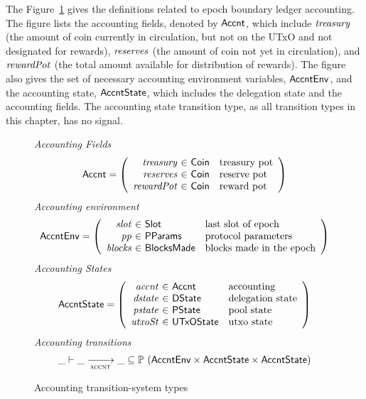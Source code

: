 The Figure~\ref{fig:ts-types:accnt} gives the definitions related to epoch
boundary ledger accounting. The figure lists the accounting fields, denoted by
$\mathsf{Accnt}$, which include $\mathit{treasury}$ (the amount of coin currently in
circulation, but not on the UTxO and not designated for rewards),
$\mathit{reserves}$ (the amount of coin
not yet in circulation),
and $\mathit{rewardPot}$ (the total amount available for distribution of rewards).
The figure also gives the set of necessary accounting environment
variables, $\mathsf{AccntEnv}$, and the accounting state, $\mathsf{AccntState}$, which includes
the delegation state and the accounting fields. The accounting state transition
type, as all transition types in this chapter, has no signal.

\begin{figure}[htb]
  \emph{Accounting Fields}
  \begin{equation*}
    \Accnt =
    \left(
      \begin{array}{r@{~\in~}ll}
        \var{treasury} & \Coin & \text{treasury pot}\\
        \var{reserves} & \Coin & \text{reserve pot}\\
        \var{rewardPot} & \Coin & \text{reward pot}\\
      \end{array}
    \right)
  \end{equation*}
  \emph{Accounting environment}
  \begin{equation*}
    \AccntEnv =
    \left(
      \begin{array}{r@{~\in~}ll}
        \var{slot} & \Slot & \text{last slot of epoch}\\
        \var{pp} & \PParams & \text{protocol parameters}\\
        \var{blocks} & \BlocksMade & \text{blocks made in the epoch}\\
      \end{array}
    \right)
  \end{equation*}
  \emph{Accounting States}
  \begin{equation*}
    \AccntState =
    \left(
      \begin{array}{r@{~\in~}ll}
        \var{accnt} & \Accnt & \text{accounting}\\
        \var{dstate} & \DState & \text{delegation state}\\
        \var{pstate} & \PState & \text{pool state}\\
        \var{utxoSt} & \UTxOState & \text{utxo state}\\
      \end{array}
    \right)
  \end{equation*}
  \emph{Accounting transitions}
  \begin{equation*}
    \_ \vdash
    \var{\_} \trans{accnt}{} \var{\_}
    \subseteq \powerset (\AccntEnv \times \AccntState \times \AccntState)
  \end{equation*}
  \caption{Accounting transition-system types}
  \label{fig:ts-types:accnt}
\end{figure}


